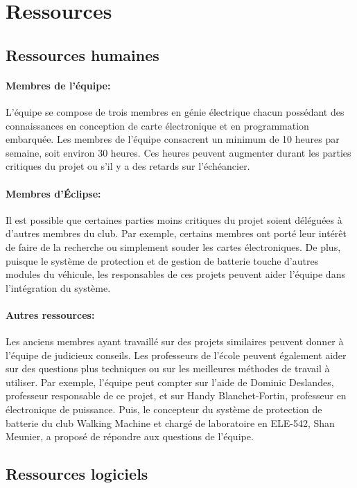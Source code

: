 \section{Ressources}

	\subsection{Ressources humaines}
	
		\paragraph{Membres de l'équipe:}
		L'équipe se compose de trois membres en génie électrique chacun possédant des connaissances en conception de carte électronique et en programmation embarquée. Les membres de l'équipe consacrent un minimum de 10 heures par semaine, soit environ 30 heures. Ces heures peuvent augmenter durant les parties critiques du projet ou s'il y a des retards sur l'échéancier.
		
		\paragraph{Membres d'Éclipse:}
		Il est possible que certaines parties moins critiques du projet soient déléguées à d'autres membres du club. Par exemple, certains membres ont porté leur intérêt de faire de la recherche ou simplement souder les cartes électroniques. De plus, puisque le système de protection et de gestion de batterie touche d'autres modules du véhicule, les responsables de ces projets peuvent aider l'équipe dans l'intégration du système.
		
		\paragraph{Autres ressources:}
		Les anciens membres ayant travaillé sur des projets similaires peuvent donner à l'équipe de judicieux conseils. Les professeurs de l'école peuvent également aider sur des questions plus techniques ou sur les meilleures méthodes de travail à utiliser. Par exemple, l'équipe peut compter sur l'aide de Dominic Deslandes, professeur responsable de ce projet, et sur Handy Blanchet-Fortin, professeur en électronique de puissance. Puis, le concepteur du système de protection de batterie du club Walking Machine et chargé de laboratoire en ELE-542, Shan Meunier, a proposé de répondre aux questions de l'équipe.
		
	\subsection{Ressources logiciels}

